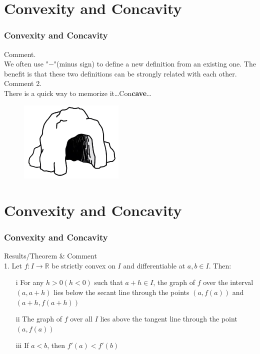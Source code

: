 \documentclass[12pt, t]{beamer}
\begin{document}
\section{Convexity and Concavity}
\begin{frame}
    \frametitle{Convexity and Concavity}
    Comment. \\
    \vspace{0.5em}
    \hspace{1em}
    We often use "$-$"(minus sign) to define a new definition from an existing one. The benefit is that these two definitions can
    be strongly related with each other.\\
    \vspace{1em}
    Comment 2.\\
    \hspace{1em}
    There is a quick way to memorize it\dots\hspace{2em}Con\textbf{cave}\dots
    \begin{figure}[H]
        \centering
        \includegraphics[width=5cm]{Figures/Concave.png}
    \end{figure}

\end{frame}

\section{Convexity and Concavity}
\begin{frame}
    \frametitle{Convexity and Concavity}
    Results/Theorem \& Comment\\
    \vspace{1em}
    1. Let $f:I\rightarrow\mathbb{R}$ be strictly convex on $I$ and differentiable at $a,b\in I$. Then:
    \begin{enumerate}
        \item[i] For any $h>0(h<0)$ such that $a+h\in I$, the graph of $f$ over the interval $(a,a+h)$ lies below the secant line through the
            points $(a,f(a))$ and $(a+h, f(a+h))$
        \item[ii] The graph of $f$ over all $I$ lies above the tangent line through the point $(a, f(a))$
        \item[iii] If $a<b$, then $f'(a)<f'(b)$
    \end{enumerate}


\end{frame}
\end{document}
